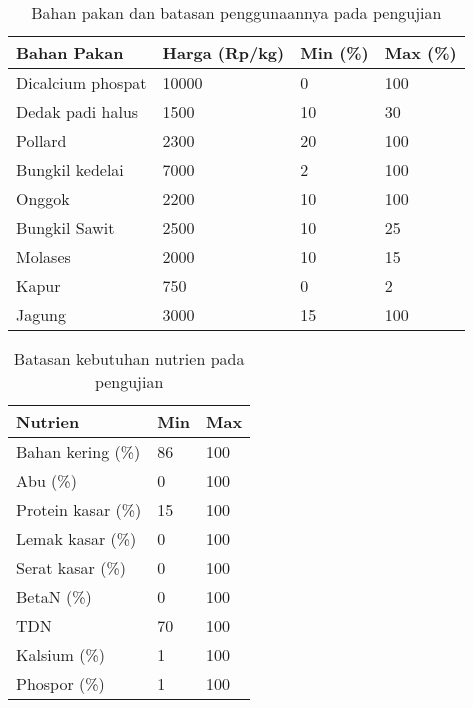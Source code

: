 \begin{table}[h!]
	\centering
	\caption{Bahan pakan dan batasan penggunaannya pada pengujian}
	\label{my-label}
	\begin{tabular}{p{3cm}p{1.5cm}p{0.75cm}p{0.75cm}}
		\hline
		Bahan Pakan        & Harga (Rp/kg) & Min (\%) & Max (\%) \\ \hline
		Dicalcium  phospat & 10000         & 0        & 100      \\
		Dedak padi halus   & 1500          & 10       & 30       \\
		Pollard            & 2300          & 20       & 100      \\
		Bungkil kedelai    & 7000          & 2        & 100      \\
		Onggok             & 2200          & 10       & 100      \\
		Bungkil Sawit      & 2500          & 10       & 25       \\
		Molases            & 2000          & 10       & 15       \\
		Kapur              & 750           & 0        & 2        \\
		Jagung             & 3000          & 15       & 100      \\ \hline
	\end{tabular}
\end{table}

\begin{table}[h!]
	\centering
	\caption{Batasan kebutuhan nutrien pada pengujian}
	\label{my-label}
	\begin{tabular}{p{3.5cm}p{0.75cm}p{0.75cm}}
		\hline
		Nutrien            & Min & Max \\ \hline
		Bahan kering (\%)  & 86  & 100 \\
		Abu (\%)           & 0   & 100 \\
		Protein kasar (\%) & 15  & 100 \\
		Lemak kasar (\%)   & 0   & 100 \\
		Serat kasar (\%)   & 0   & 100 \\
		BetaN (\%)         & 0   & 100 \\
		TDN                & 70  & 100 \\
		Kalsium (\%)       & 1   & 100 \\
		Phospor (\%)       & 1   & 100 \\ \hline
	\end{tabular}
\end{table}

